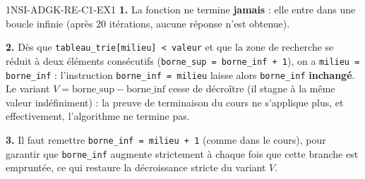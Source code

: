 
\begin{corrige}{1NSI-ADGK-RE-C1-EX1}
\textbf{1.} La fonction ne termine \textbf{jamais} : elle entre dans une boucle infinie
(après $20$ itérations, aucune réponse n'est obtenue).

\textbf{2.} Dès que \lstinline{tableau_trie[milieu] < valeur} et que la zone de recherche
se réduit à deux éléments consécutifs (\lstinline{borne_sup = borne_inf + 1}), on a
\lstinline{milieu = borne_inf} : l'instruction \lstinline{borne_inf = milieu} laisse alors
\lstinline{borne_inf} \textbf{inchangé}. Le variant $V=\text{borne\_sup}-\text{borne\_inf}$
cesse de décroître (il stagne à la même valeur indéfiniment) : la preuve de terminaison du
cours ne s'applique plus, et effectivement, l'algorithme ne termine pas.

\textbf{3.} Il faut remettre \lstinline{borne_inf = milieu + 1} (comme dans le cours), pour
garantir que \lstinline{borne_inf} augmente strictement à chaque fois que cette branche est
empruntée, ce qui restaure la décroissance stricte du variant $V$.
\end{corrige}

